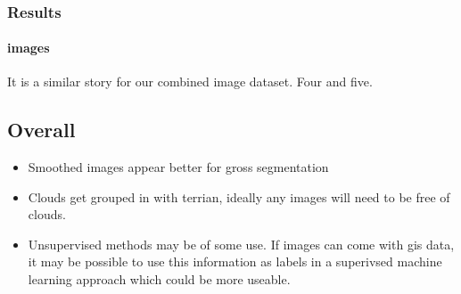 \documentclass[11pt]{article}
\providecommand{\tightlist}{%
      \setlength{\itemsep}{0pt}\setlength{\parskip}{0pt}}
\begin{document}
    \begin{center}
    \end{center}
    { \hspace*{\fill} \\}
    
    \subsubsection{Results}\label{results}

\paragraph{images}\label{images}

It is a similar story for our combined image dataset. Four and five.

    \subsection{Overall}\label{overall}

\begin{itemize}
\tightlist
\item
  Smoothed images appear better for gross segmentation
\item
  Clouds get grouped in with terrian, ideally any images will need to be
  free of clouds.
\item
  Unsupervised methods may be of some use. If images can come with gis
  data, it may be possible to use this information as labels in a
  superivsed machine learning approach which could be more useable.
\end{itemize}


    
    
    
    
\end{document}
